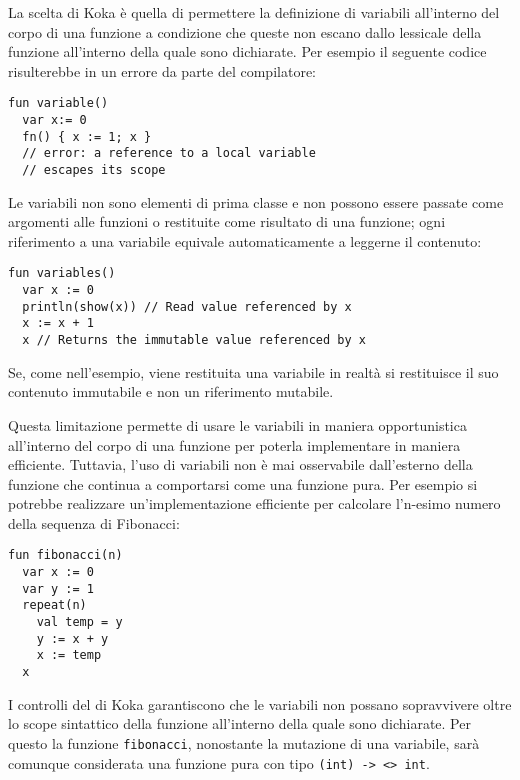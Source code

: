 La scelta di Koka è quella di permettere la definizione di variabili all'interno del corpo di una funzione a condizione che queste non escano dallo  lessicale della funzione all'interno della quale sono dichiarate. Per esempio il seguente codice risulterebbe in un errore da parte del compilatore:
\begin{lstlisting}[language=koka]
fun variable()
  var x:= 0
  fn() { x := 1; x }
  // error: a reference to a local variable 
  // escapes its scope
\end{lstlisting}

Le variabili non sono elementi di prima classe e non possono essere passate come argomenti alle funzioni o restituite come risultato di una funzione; ogni riferimento a una variabile equivale automaticamente a leggerne il contenuto:
\begin{lstlisting}[language=koka]
fun variables()
  var x := 0
  println(show(x)) // Read value referenced by x
  x := x + 1
  x // Returns the immutable value referenced by x
\end{lstlisting}
Se, come nell'esempio, viene restituita una variabile in realtà si restituisce il suo contenuto immutabile e non un riferimento mutabile.

Questa limitazione permette di usare le variabili in maniera opportunistica all'interno del corpo di una funzione per poterla implementare in maniera efficiente. Tuttavia, l'uso di variabili non è mai osservabile dall'esterno della funzione che continua a comportarsi come una funzione pura. Per esempio si potrebbe realizzare un'implementazione efficiente per calcolare l'n-esimo numero della sequenza di Fibonacci:
\begin{lstlisting}[language=koka]
fun fibonacci(n)
  var x := 0
  var y := 1
  repeat(n)
    val temp = y
    y := x + y
    x := temp
  x
\end{lstlisting}
I controlli del  di Koka garantiscono che le variabili non possano sopravvivere oltre lo scope sintattico della funzione all'interno della quale sono dichiarate. Per questo la funzione \lstinline{fibonacci}, nonostante la mutazione di una variabile, sarà comunque considerata una funzione pura con tipo \lstinline{(int) -> <> int}.
